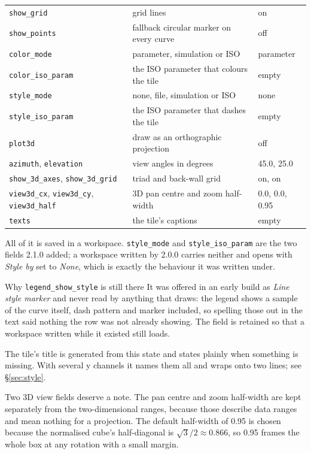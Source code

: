 \documentclass[11pt,a4paper,oneside]{report}
\newcommand{\code}[1]{\texttt{#1}}
\begin{document}
\begin{center}
\begin{longtable}{@{}p{}p{}p{}@{}}
\code{show\_grid} & grid lines & on \\
\code{show\_points} & fallback circular marker on every curve & off \\
\code{color\_mode} & parameter, simulation or ISO & parameter \\
\code{color\_iso\_param} & the ISO parameter that colours the tile & empty \\
\code{style\_mode} & none, file, simulation or ISO & none \\
\code{style\_iso\_param} & the ISO parameter that dashes the tile & empty \\
\code{plot3d} & draw as an orthographic projection & off \\
\code{azimuth}, \code{elevation} & view angles in degrees & 45.0, 25.0 \\
\code{show\_3d\_axes}, \code{show\_3d\_grid} & triad and back-wall grid & on, on \\
\code{view3d\_cx}, \code{view3d\_cy}, \code{view3d\_half} & 3D pan centre and zoom half-width & 0.0, 0.0, 0.95 \\
\code{texts} & the tile's captions & empty \\
\bottomrule
\end{longtable}
\end{center}

All of it is saved in a workspace. \code{style\_mode} and
\code{style\_iso\_param} are the two fields 2.1.0 added; a workspace written by
2.0.0 carries neither and opens with \emph{Style by} set to \emph{None}, which is
exactly the behaviour it was written under.

\begin{aoenote}{Why \code{legend\_show\_style} is still there}
It was offered in an early build as \emph{Line style marker} and never read by
anything that draws: the legend shows a sample of the curve itself, dash pattern
and marker included, so spelling those out in the text said nothing the row was
not already showing. The field is retained so that a workspace written while it
existed still loads.
\end{aoenote}

The tile's title is generated from this state and states plainly when something
is missing. With several y channels it names them all and wraps onto two lines;
see \S\ref{sec:style}.

Two 3D view fields deserve a note. The pan centre and zoom half-width are kept
separately from the two-dimensional ranges, because those describe data ranges
and mean nothing for a projection. The default half-width of 0.95 is chosen
because the normalised cube's half-diagonal is $\sqrt{3}/2 \approx 0.866$, so
0.95 frames the whole box at any rotation with a small margin.
\end{document}
